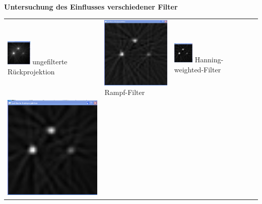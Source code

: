             \ \\
            \textbf{Untersuchung des Einflusses verschiedener Filter}\\
            \begin{center}
              \begin{longtable}{p{4.0cm}p{4.0cm}p{4.0cm}l}
                  \includegraphics[width=0.25\textwidth, height=0.15\textheight]{pic/Einzelfenster_Bilder/unbekannte_Quelle/unbek5_einf_prj.png}
                  ungefilterte Rückprojektion
                  & 
                  \includegraphics[width=.25\textwidth, height=0.15\textheight]{pic/Einzelfenster_Bilder/unbekannte_Quelle/unbek5_ramp.png}
                  Rampf-Filter
                  &
                  \includegraphics[width=0.25\textwidth, height=0.15\textheight]{pic/Einzelfenster_Bilder/unbekannte_Quelle/unbek5_hanning_weighted.png}
                  Hanning-weighted-Filter\\
                  \includegraphics[width=.25\textwidth, height=0.15\textheight]{pic/Einzelfenster_Bilder/unbekannte_Quelle/unbek5_middle.png} 

\end{longtable}
\end{center}
